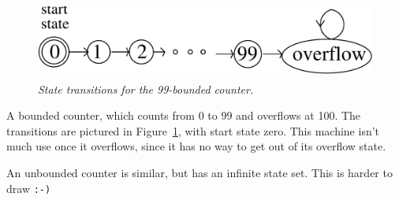 \begin{figure}[htbp]
\centering \includegraphics[height=1in]{figures/counter}
\caption{\em State transitions for the 99-bounded counter.}
\label{fig:counter}
\end{figure}

\begin{example}
A bounded counter, which counts from $0$ to $99$ and overflows at 100.
The transitions are pictured in Figure~\ref{fig:counter}, with start
state zero.  This machine isn't much use once it overflows, since it
has no way to get out of its overflow state.

\end{example}

\begin{example}
An unbounded counter is similar, but has an infinite state set.  This is
harder to draw \texttt{:-)}
\end{example}

